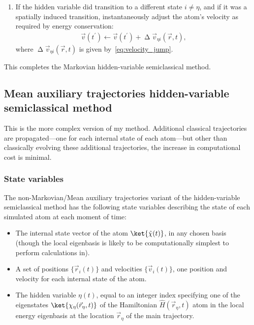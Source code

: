 \begin{enumerate}
    \item If the hidden variable did transition to a different state $i\neq\eta$, and if it was a spatially induced transition, instantaneously adjust the atom's velocity as required by energy conservation:
    \begin{align}
    \vec v(t^\prime) \leftarrow \vec v(t^\prime) + \upDelta \vec v_{\eta i}(\vec r, t),
    \end{align}
    where $\upDelta \vec v_{\eta i}(\vec r, t)$ is given by~\eqref{eq:velocity_jump}.
\end{enumerate}

This completes the Markovian hidden-variable semiclassical method.

\subsection{Mean auxiliary trajectories hidden-variable semiclassical method}\label{sec:non_markovian_decoherence}

This is the more complex version of my method. Additional classical trajectories are propagated---one for each internal state of each atom---but other than classically evolving these additional trajectories, the increase in computational cost is minimal.

\subsubsection{State variables}
The non-Markovian/Mean auxiliary trajectories variant of the hidden-variable semiclassical method has the following state variables describing the state of each simulated atom at each moment of time:
\begin{itemize}
    \item The internal state vector of the atom $\ket{\tilde\chi(t)}$, in any chosen basis (though the local eigenbasis is likely to be computationally simplest to perform calculations in).
    \item A set of positions $\{\vec r_i(t)\}$ and velocities $\{\vec v_i(t)\}$, one position and velocity for each internal state of the atom.
    \item The hidden variable $\eta(t)$, equal to an integer index specifying one of the eigenstates $\ket{\chi_\eta(\vec r_\eta, t)}$ of the Hamiltonian $\hat H(\vec r_\eta, t)$ atom in the local energy eigenbasis at the location $\vec r_\eta$ of the main trajectory.
\end{itemize}

